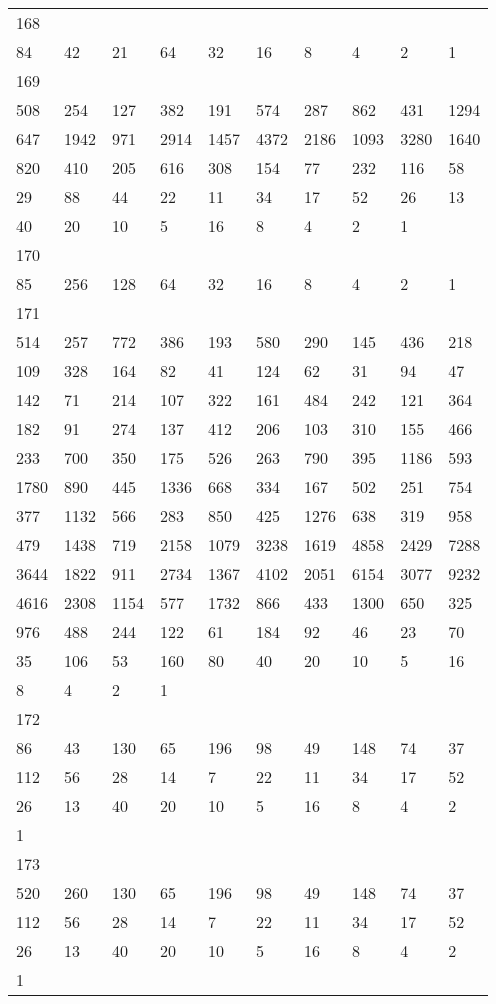 \begin{longtable}{*{10}{l}}
168&&&&&&&&&\\
84& 42& 21& 64& 32& 16& 8& 4& 2& 1\\

169&&&&&&&&&\\
508& 254& 127& 382& 191& 574& 287& 862& 431& 1294\\
647& 1942& 971& 2914& 1457& 4372& 2186& 1093& 3280& 1640\\
820& 410& 205& 616& 308& 154& 77& 232& 116& 58\\
29& 88& 44& 22& 11& 34& 17& 52& 26& 13\\
40& 20& 10& 5& 16& 8& 4& 2& 1& \\

170&&&&&&&&&\\
85& 256& 128& 64& 32& 16& 8& 4& 2& 1\\

171&&&&&&&&&\\
514& 257& 772& 386& 193& 580& 290& 145& 436& 218\\
109& 328& 164& 82& 41& 124& 62& 31& 94& 47\\
142& 71& 214& 107& 322& 161& 484& 242& 121& 364\\
182& 91& 274& 137& 412& 206& 103& 310& 155& 466\\
233& 700& 350& 175& 526& 263& 790& 395& 1186& 593\\
1780& 890& 445& 1336& 668& 334& 167& 502& 251& 754\\
377& 1132& 566& 283& 850& 425& 1276& 638& 319& 958\\
479& 1438& 719& 2158& 1079& 3238& 1619& 4858& 2429& 7288\\
3644& 1822& 911& 2734& 1367& 4102& 2051& 6154& 3077& 9232\\
4616& 2308& 1154& 577& 1732& 866& 433& 1300& 650& 325\\
976& 488& 244& 122& 61& 184& 92& 46& 23& 70\\
35& 106& 53& 160& 80& 40& 20& 10& 5& 16\\
8& 4& 2& 1& \\

172&&&&&&&&&\\
86& 43& 130& 65& 196& 98& 49& 148& 74& 37\\
112& 56& 28& 14& 7& 22& 11& 34& 17& 52\\
26& 13& 40& 20& 10& 5& 16& 8& 4& 2\\
1& \\

173&&&&&&&&&\\
520& 260& 130& 65& 196& 98& 49& 148& 74& 37\\
112& 56& 28& 14& 7& 22& 11& 34& 17& 52\\
26& 13& 40& 20& 10& 5& 16& 8& 4& 2\\
1& \\


\end{longtable}
